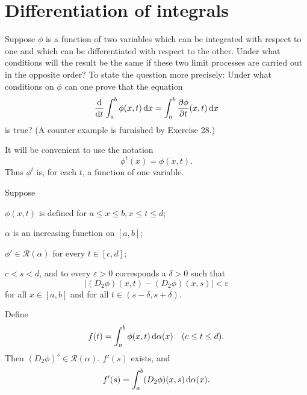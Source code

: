 
\section{Differentiation of integrals}

Suppose $\phi$ is a function of two variables which can be integrated with respect to one and which can be differentiated with respect to the other. 
Under what conditions will the result be the same if these two limit processes are carried out in the opposite order? 
To state the question more precisely: Under what
conditions on $\phi$ can one prove that the equation
\begin{equation}
    \label{eq:9.98}
    \frac{\d}{\d t} \int_{a}^{b} \phi (x,t) \d x = 
    \int_{a}^{b} \frac{\partial \phi}{\partial t}(x,t) \d x
\end{equation}
is true?
(A counter example is furnished by Exercise 28.)

It will be convenient to use the notation
\begin{equation}
    \label{eq:9.99}
    \phi^t(x) = \phi (x, t).
\end{equation}
Thus $\phi^t$ is, for each $t$, a function of one variable.

\begin{thm}
    \label{thm:9.42}
    Suppose 
    \begin{asparaenum}[(a)]
        \item $\phi(x,t)$ is defined for $a \leq x \leq b,x \leq t \leq d$;
        \item $\alpha$ is an increasing function on $[a,b]$;
        \item $\phi' \in \mathscr{R}(\alpha)$ for every $t \in [c,d]$;
        \item $c<s<d$, and to every $\varepsilon > 0$ corresponds a $\delta > 0$ such that 
        \begin{equation*}
            \left| (D_2 \phi)(x,t) - (D_2 \phi)(x,s) \right| < \varepsilon
        \end{equation*}
        for all $x \in [a,b]$ and for all $t \in (s-\delta, s+\delta)$.
    \end{asparaenum}
    Define 
    \begin{equation}
        \label{eq:9.100}
        f(t) = \int_{a}^{b} \phi(x,t) \d \alpha(x)
        \quad 
        (c \leq t \leq d) .
    \end{equation}
    Then $(D_2 \phi)^s \in \mathscr{R}(\alpha)$. $f'(s)$ exists, and 
    \begin{equation}
        \label{eq:9.101}
        f'(s) = \int_{a}^{b} (D_2 \phi)(x,s) \d \alpha(x).
    \end{equation}
\end{thm}

